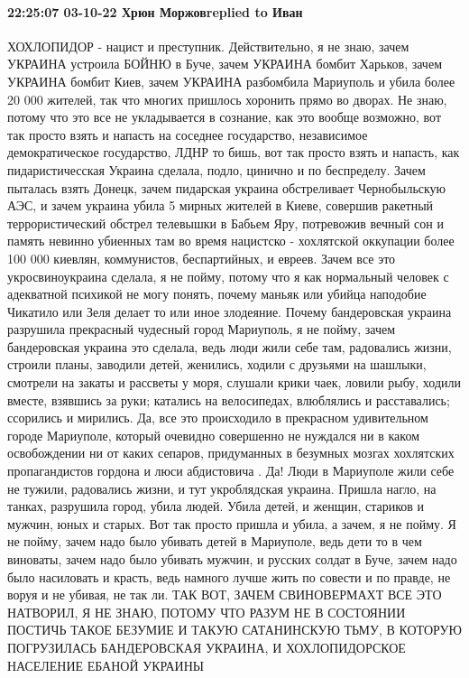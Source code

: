  
 
 
 
 

\paragraph{22:25:07 03-10-22 Хрюн Моржовreplied to Иван}

ХОХЛОПИДОР - нацист и
преступник. Действительно, я не знаю, зачем УКРАИНА устроила БОЙНЮ в Буче, зачем УКРАИНА бомбит Харьков, зачем УКРАИНА бомбит
Киев, зачем УКРАИНА разбомбила Мариуполь и убила более 20 000 жителей, так что многих
пришлось хоронить прямо во дворах. Не
знаю, потому что это все не укладывается в сознание, как это вообще возможно, вот так просто взять и напасть на соседнее
государство, независимое демократическое
государство, ЛДНР то бишь, вот так просто взять и напасть, как пидаристичесская
Украина сделала, подло, цинично и по беспределу. Зачем пыталась взять Донецк, зачем пидарская украина обстреливает Чернобыльскую
АЭС, и зачем украина убила 5 мирных жителей
в Киеве, совершив ракетный террористический обстрел телевышки в Бабьем Яру, потревожив вечный сон и память невинно
убиенных там во время нацистско -
хохлятской оккупации более 100 000 киевлян, коммунистов, беспартийных, и
евреев. Зачем все это укросвиноукраина сделала, я не пойму, потому что я как
нормальный человек с адекватной психикой
не могу понять, почему маньяк или убийца наподобие Чикатило или Зеля делает то или иное злодеяние. Почему
бандеровская украина разрушила прекрасный чудесный город Мариуполь, я не пойму, зачем
бандеровская украина это сделала,
ведь люди жили себе там, радовались жизни,
строили планы, заводили детей, женились,
ходили с друзьями на шашлыки, смотрели на закаты и рассветы у моря, слушали крики чаек, ловили рыбу, ходили вместе, взявшись за руки; катались
на велосипедах, влюблялись и расставались; ссорились
и мирились. Да, все это происходило в
прекрасном удивительном городе Мариуполе, который очевидно совершенно не нуждался ни в каком освобождении ни от
каких сепаров, придуманных в безумных
мозгах хохлятских пропагандистов гордона и люси абдистовича . Да! Люди в Мариуполе жили себе не тужили, радовались
жизни, и тут укроблядская украина. Пришла
нагло, на танках, разрушила город, убила людей. Убила детей, и женщин, стариков и мужчин, юных и старых. Вот так просто
пришла и убила, а зачем, я не пойму. Я не
пойму, зачем надо было убивать детей в Мариуполе, ведь дети то в чем виноваты, зачем надо было убивать мужчин, и
русских солдат в Буче, зачем надо было
насиловать и красть, ведь намного лучше жить по
совести и по правде, не воруя и не убивая,
не так ли. ТАК ВОТ, ЗАЧЕМ СВИНОВЕРМАХТ ВСЕ ЭТО НАТВОРИЛ, Я НЕ ЗНАЮ, ПОТОМУ ЧТО РАЗУМ НЕ В СОСТОЯНИИ ПОСТИЧЬ ТАКОЕ
БЕЗУМИЕ И ТАКУЮ САТАНИНСКУЮ ТЬМУ, В КОТОРУЮ
ПОГРУЗИЛАСЬ БАНДЕРОВСКАЯ УКРАИНА, И ХОХЛОПИДОРСКОЕ НАСЕЛЕНИЕ ЕБАНОЙ
УКРАИНЫ
